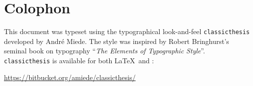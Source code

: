 \pagestyle{empty}

\hfill

\vfill


\section*{Colophon}
This document was typeset using the typographical look-and-feel \texttt{classicthesis} developed by Andr\'e Miede. 
The style was inspired by Robert Bringhurst's seminal book on typography ``\emph{The Elements of Typographic Style}''. 
\texttt{classicthesis} is available for both \LaTeX\ and \mLyX: 
\begin{center}
\url{https://bitbucket.org/amiede/classicthesis/}
\end{center}

\bigskip

\noindent\finalVersionString


%
%




